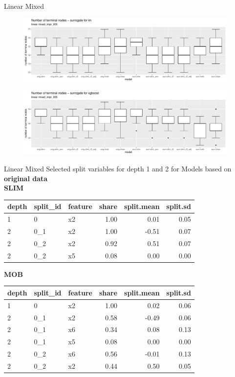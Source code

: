 \documentclass[9pt, xcolor=table]{beamer}
\begin{document}
\begin{frame}{Linear Mixed}
\begin{figure}
    \includegraphics[width=11cm]{Figures/Stability/linear_mixed_impr_005/lm_nofnodes.pdf}
\end{figure}   

\begin{figure}
    \includegraphics[width=11cm]{Figures/Stability/linear_mixed_impr_005/xgboost_nofnodes.pdf}
\end{figure}  

\end{frame}

\begin{frame}{Linear Mixed}
Selected split variables for depth 1 and 2 for Models based on \textbf{original data}\\
\textbf{SLIM}

\begin{table}[ht]
\centering
\begin{tabular}{lllrrr}
  \hline
depth & split\_id & feature & share & split.mean & split.sd \\ 
  \hline
1 & 0 & x2 & 1.00 & 0.01 & 0.05 \\ 
  2 & 0\_1 & x2 & 1.00 & -0.51 & 0.07 \\ 
  2 & 0\_2 & x2 & 0.92 & 0.51 & 0.07 \\ 
  2 & 0\_2 & x5 & 0.08 & 0.00 & 0.00 \\ 
   \hline
\end{tabular}
\end{table}

\textbf{MOB}
\begin{table}[ht]
\centering
\begin{tabular}{lllrrr}
  \hline
depth & split\_id & feature & share & split.mean & split.sd \\ 
  \hline
1 & 0 & x2 & 1.00 & 0.02 & 0.06 \\ 
  2 & 0\_1 & x2 & 0.58 & -0.49 & 0.06 \\ 
  2 & 0\_1 & x6 & 0.34 & 0.08 & 0.13 \\ 
  2 & 0\_1 & x5 & 0.08 & 0.00 & 0.00 \\ 
  2 & 0\_2 & x6 & 0.56 & -0.01 & 0.13 \\ 
  2 & 0\_2 & x2 & 0.44 & 0.50 & 0.05 \\ 
   \hline
\end{tabular}
\end{table}

\end{frame}
\end{document}
